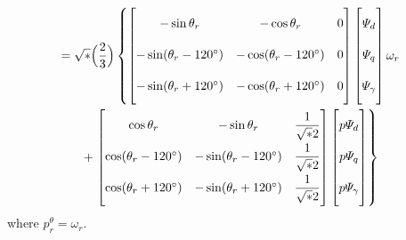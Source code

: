 \documentclass[a4paper,numbers=noenddot,12pt]{scrbook}
\begin{document}
    \begin{multline}
        [v_{abc}] = \sqrt*{\Big( \dfrac{2}{3} \Big)} 
        \left\{
            \begin{bmatrix}
                -\sin \theta_r & -\cos \theta_r & 0 \vphantom{\dfrac{1}{\sqrt*{2}}}\\[2ex]
                -\sin (\theta_r - 120^{\circ}) & -\cos (\theta_r - 120^{\circ}) & 0 \vphantom{\dfrac{1}{\sqrt*{2}}}\\[2ex]
                -\sin (\theta_r + 120^{\circ}) & -\cos (\theta_r + 120^{\circ}) & 0 \vphantom{\dfrac{1}{\sqrt*{2}}}
            \end{bmatrix}
            \begin{bmatrix}
                \varPsi_d \vphantom{\dfrac{1}{\sqrt*{2}}} \\[2ex] 
                \varPsi_q \vphantom{\dfrac{1}{\sqrt*{2}}}\\[2ex]
                \varPsi_{\gamma} \vphantom{\dfrac{1}{\sqrt*{2}}}
            \end{bmatrix}
            \omega_r
            \right.
            \\
            +
            \left.
            \begin{bmatrix}
                \cos \theta_r & -\sin \theta_r & \dfrac{1}{\sqrt*{2}} \\[2ex]
                \cos (\theta_r - 120^{\circ}) & -\sin (\theta_r - 120^{\circ}) & \dfrac{1}{\sqrt*{2}} \\[2ex]
                \cos (\theta_r + 120^{\circ}) & -\sin (\theta_r + 120^{\circ}) & \dfrac{1}{\sqrt*{2}}
            \end{bmatrix}
            \begin{bmatrix}
                p \varPsi_d \vphantom{\dfrac{1}{\sqrt*{2}}} \\[2ex] p \varPsi_q \vphantom{\dfrac{1}{\sqrt*{2}}}\\[2ex] p \varPsi_{\gamma} \vphantom{\dfrac{1}{\sqrt*{2}}}
            \end{bmatrix}
        \right\}
        \label{}
    \end{multline}
    where $p_r^{\theta} = \omega_r$.
\end{document}
